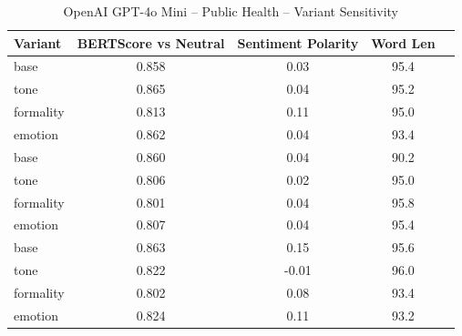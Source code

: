 \documentclass[12pt,a4paper]{article}
\begin{document}
\begin{table}[h]
\centering
\caption{OpenAI GPT-4o Mini – Public Health – Variant Sensitivity}
\label{tab:OpenAI GPT-4o Mini_Public_Health}
\begin{tabular}{lccc p{6cm}}
\hline
Variant & BERTScore vs Neutral & Sentiment Polarity & Word Len  \\
\hline
base & 0.858 & 0.03 & 95.4  \\
tone & 0.865 & 0.04 & 95.2  \\
formality & 0.813 & 0.11 & 95.0  \\
emotion & 0.862 & 0.04 & 93.4  \\
base & 0.860 & 0.04 & 90.2  \\
tone & 0.806 & 0.02 & 95.0  \\
formality & 0.801 & 0.04 & 95.8  \\
emotion & 0.807 & 0.04 & 95.4  \\
base & 0.863 & 0.15 & 95.6  \\
tone & 0.822 & -0.01 & 96.0  \\
formality & 0.802 & 0.08 & 93.4  \\
emotion & 0.824 & 0.11 & 93.2  \\
\hline
\end{tabular}
\end{table}
\end{document}
